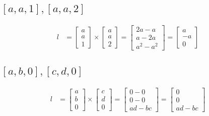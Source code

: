 \documentclass[12pt, oneside]{article}
\begin{document}
\subsection{$[a, a, 1], [a, a, 2]$}
  \begin{align*}
    l &= \begin{bmatrix}
           a \\
           a \\
           1
         \end{bmatrix} \times 
          \begin{bmatrix}
                    a \\
                    a \\
                    2
                  \end{bmatrix}  
= 
 \begin{bmatrix}
                    2a - a \\
                    a - 2a \\
                    a^2 - a^2
                  \end{bmatrix}                   
= 
 \begin{bmatrix}
                    a  \\
                    -a  \\
                    0 
                  \end{bmatrix}                                                   
  \end{align*}

\subsection{$[a, b, 0], [c, d, 0]$}
  \begin{align*}
    l &= \begin{bmatrix}
           a \\
           b \\
           0
         \end{bmatrix} \times 
          \begin{bmatrix}
                    c \\
                    d \\
                    0
                  \end{bmatrix}  
= 
 \begin{bmatrix}
                    0 -0 \\
                    0-0 \\
                    ad - bc
                  \end{bmatrix}                   
= 
 \begin{bmatrix}
                    0  \\
                    0  \\
                    ad - bc 
                  \end{bmatrix}                                                   
  \end{align*}
  
\end{document}

